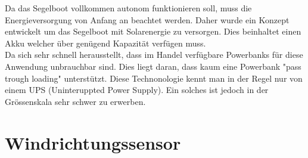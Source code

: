 Da das Segelboot vollkommen autonom funktionieren soll, muss die Energieversorgung von Anfang an beachtet werden. Daher wurde ein Konzept entwickelt um das Segelboot mit Solarenergie zu versorgen. Dies beinhaltet einen Akku welcher über genügend Kapazität verfügen muss. \\
Da sich sehr schnell herausstellt, dass im Handel verfügbare Powerbanks für diese Anwendung unbrauchbar sind. Dies liegt daran, dass kaum eine Powerbank "pass trough loading" unterstützt. Diese Technonologie kennt man in der Regel nur von einem UPS (Uninteruppted Power Supply). Ein solches ist jedoch in der Grössenskala sehr schwer zu erwerben. 


\section{Windrichtungssensor}








